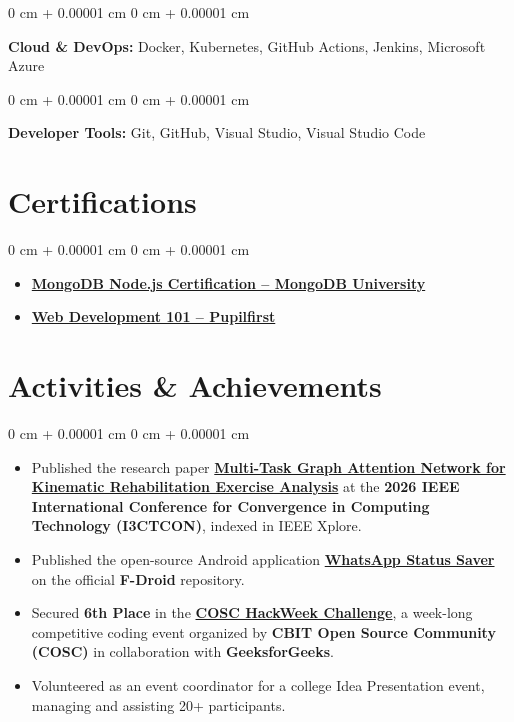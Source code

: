 \documentclass[10pt, letterpaper]{article}
\newenvironment{highlights}{
    \begin{itemize}[
        topsep=0.07 cm,
        parsep=0.045 cm,
        partopsep=0pt,
        itemsep=0pt,
        leftmargin=0 cm + 10pt
    ]
}{
    \end{itemize}
}
\newenvironment{onecolentry}{
    \begin{adjustwidth}{
        0 cm + 0.00001 cm
    }{
        0 cm + 0.00001 cm
    }
}{
    \end{adjustwidth}
}
\newcommand{\activityLink}[1]{{\color{mutedColor}#1}}
\let\oldhref\href
\renewcommand{\href}[2]{\oldhref{#1}{\textbf{#2}}}
\begin{document}
\vspace{0.11cm}

\begin{onecolentry}
\textbf{Cloud \& DevOps:}
Docker, Kubernetes, GitHub Actions, Jenkins, Microsoft Azure
\end{onecolentry}

\vspace{0.11cm}

\begin{onecolentry}
\textbf{Developer Tools:}
Git, GitHub, Visual Studio, Visual Studio Code
\end{onecolentry}

\section{Certifications}

\begin{onecolentry}
\begin{highlights}
    \item \href{https://ti-user-certificates.s3.amazonaws.com/ae62dcd7-abdc-4e90-a570-83eccba49043/95a45e5b-2d7e-4586-b30c-e7f4589d1f56-vinith-reddy-banda-767cf9b1-af80-411a-ae27-724cefe7df97-certificate.pdf}{MongoDB Node.js Certification -- MongoDB University}
    \item \href{https://www.pupilfirst.school/c/240307-7VQD0R}{Web Development 101 -- Pupilfirst}
\end{highlights}
\end{onecolentry}

\section{Activities \& Achievements}

\begin{onecolentry}
    \begin{highlights}
        \item Published the research paper \href{https://ieeexplore.ieee.org/document/11507447}{\activityLink{\textbf{Multi-Task Graph Attention Network for Kinematic Rehabilitation Exercise Analysis}}} at the \textbf{2026 IEEE International Conference for Convergence in Computing Technology (I3CTCON)}, indexed in IEEE Xplore.
        
        \item Published the open-source Android application \href{https://f-droid.org/packages/com.vinithreddybanda.whatsapstatus/}{\activityLink{\textbf{WhatsApp Status Saver}}} on the official \textbf{F-Droid} repository.

       \item Secured \textbf{6th Place} in the \href{https://drive.google.com/file/d/15ES4cdWtAv5WHb2AfDR0ifpoEQ2f_7Hh/view?usp=drive_link}{\activityLink{\textbf{COSC HackWeek Challenge}}}, a week-long competitive coding event organized by \textbf{CBIT Open Source Community (COSC)} in collaboration with \textbf{GeeksforGeeks}. 

        \item Volunteered as an event coordinator for a college Idea Presentation event, managing and assisting 20+ participants.
    \end{highlights}
\end{onecolentry}
\end{document}

